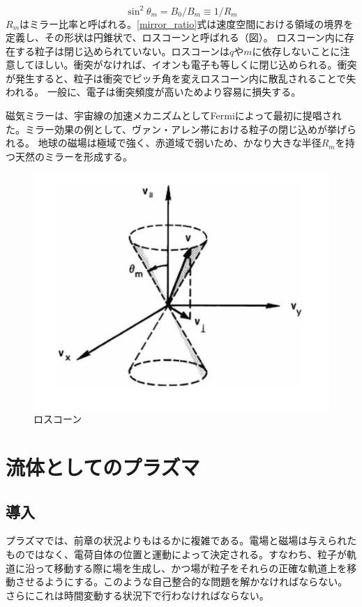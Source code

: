 \documentclass{ltjsarticle}
\numberwithin{equation}{section} %
\begin{document}
\begin{equation}
  \sin^2 \theta_m = B_0/B_m \equiv 1/R_m \label{mirror_ratio}
\end{equation}
$R_m$はミラー比率と呼ばれる。\eqref{mirror_ratio}式は速度空間における領域の境界を定義し、その形状は円錐状で、ロスコーンと呼ばれる（図）。
ロスコーン内に存在する粒子は閉じ込められていない。ロスコーンは$q$や$m$に依存しないことに注意してほしい。衝突がなければ、イオンも電子も等しくに閉じ込められる。衝突が発生すると、粒子は衝突でピッチ角を変えロスコーン内に散乱されることで失われる。
一般に、電子は衝突頻度が高いためより容易に損失する。

磁気ミラーは、宇宙線の加速メカニズムとしてFermiによって最初に提唱された。ミラー効果の例として、ヴァン・アレン帯における粒子の閉じ込めが挙げられる。
地球の磁場は極域で強く、赤道域で弱いため、かなり大きな半径$R_m$を持つ天然のミラーを形成する。

\begin{figure}[htbp]
  \centering
  \includegraphics[width=0.7\linewidth]{loss_cone.png}
  \caption{ロスコーン}
  \label{loss_cone}
\end{figure}









\section{流体としてのプラズマ}
\subsection{導入}
プラズマでは、前章の状況よりもはるかに複雑である。電場と磁場は与えられたものではなく、電荷自体の位置と運動によって決定される。すなわち、粒子が軌道に沿って移動する際に場を生成し、かつ場が粒子をそれらの正確な軌道上を移動させるようにする。このような自己整合的な問題を解かなければならない。さらにこれは時間変動する状況下で行わなければならない。
\end{document}
